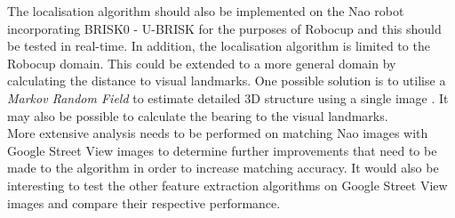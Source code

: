 The localisation algorithm should also be implemented on the Nao robot incorporating BRISK0 - U-BRISK for the purposes of Robocup and this should be tested in real-time. In addition, the localisation algorithm is limited to the Robocup domain. This could be extended to a more general domain by calculating the distance to visual landmarks. One possible solution is to utilise a \textit{Markov Random Field} to estimate detailed 3D structure using a single image \citep{Saxena}. It may also be possible to calculate the bearing to the visual landmarks. \\ 

More extensive analysis needs to be performed on matching Nao images with Google Street View images to determine further improvements that need to be made to the algorithm in order to increase matching accuracy. It would also be interesting to test the other feature extraction algorithms on Google Street View images and compare their respective performance.\\